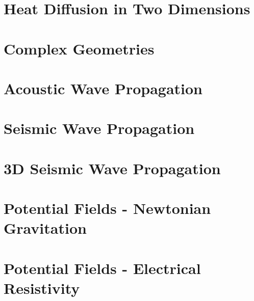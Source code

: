 \documentclass{esysdoc}
\begin{document}
\chapter{Heat Diffusion in Two Dimensions}
 \label{CHAP HEAT 2a}
 
\chapter{Complex Geometries}
 \label{CHAP HEAT 2}
 
 
\chapter{Acoustic Wave Propagation}
% 
\chapter{Seismic Wave Propagation}
 

\chapter{3D Seismic Wave Propagation}
 
 
\chapter{Potential Fields - Newtonian Gravitation}
 
%  
\chapter{Potential Fields - Electrical Resistivity}
 





\appendix
%
\printindex
\end{document}
